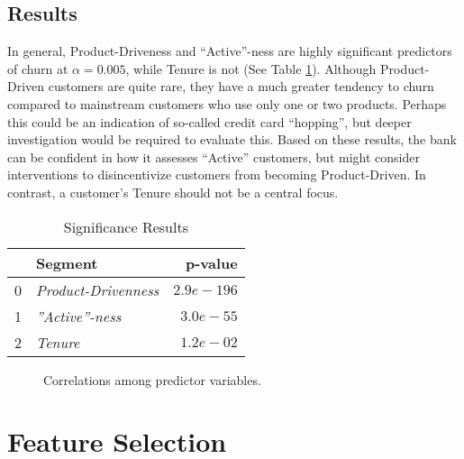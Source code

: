 \documentclass[twoside,twocolumn]{article}
\begin{document}
\subsection*{\large{Results}}
In general, Product-Driveness and “Active”-ness are highly significant predictors of churn at $\alpha = 0.005$, while Tenure is not (See Table \ref{table:significance}).  Although Product-Driven customers are quite rare, they have a much greater tendency to churn compared to mainstream customers who use only one or two products. Perhaps this could be an indication of so-called credit card “hopping”, but deeper investigation would be required to evaluate this. Based on these results, the bank can be confident in how it assesses “Active” customers, but might consider interventions to disincentivize customers from becoming Product-Driven. In contrast, a customer’s Tenure should not be a central focus.
\begin{table}
  \centering
  \caption{Significance Results}
  \begin{tabular}{llr}
    \toprule
    {} &                Segment &        p-value \\
    \midrule
    0 &  \textit{Product-Drivenness} &  $2.9e-196$ \\
    1 &     \textit{''Active''-ness} &   $3.0e-55$ \\
    2 &              \textit{Tenure} &   $1.2e-02$ \\
    \bottomrule  
  \end{tabular}
  \label{table:significance}
\end{table}

\begin{figure}
  \begin{center}
    \resizebox{7cm}{!}{
      
    }
  \end{center}
  \caption{Correlations among predictor variables.}
\end{figure}

\section{Feature Selection}
\end{document}
